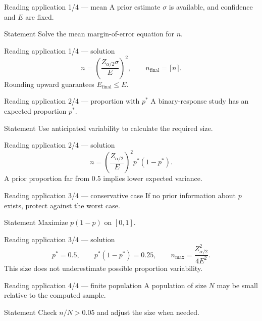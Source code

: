 \documentclass[10pt,aspectratio=169]{beamer}
\begin{document}
\begin{frame}{Reading application 1/4 --- mean}
  \footnotesize
  A prior estimate $\sigma$ is available, and confidence and $E$ are fixed.
  \begin{block}{Statement}
    Solve the mean margin-of-error equation for $n$.
  \end{block}
\end{frame}

\begin{frame}{Reading application 1/4 --- solution}
  \footnotesize
  \[
    n=\left(\frac{Z_{\alpha/2}\sigma}{E}\right)^2,
    \qquad n_{\text{final}}=\lceil n\rceil.
  \]
  Rounding upward guarantees $E_{\text{final}}\le E$.
\end{frame}

\begin{frame}{Reading application 2/4 --- proportion with $p^*$}
  \footnotesize
  A binary-response study has an expected proportion $p^*$.
  \begin{block}{Statement}
    Use anticipated variability to calculate the required size.
  \end{block}
\end{frame}

\begin{frame}{Reading application 2/4 --- solution}
  \footnotesize
  \[
    n=\left(\frac{Z_{\alpha/2}}{E}\right)^2p^*(1-p^*).
  \]
  A prior proportion far from $0.5$ implies lower expected variance.
\end{frame}

\begin{frame}{Reading application 3/4 --- conservative case}
  \footnotesize
  If no prior information about $p$ exists, protect against the worst case.
  \begin{block}{Statement}
    Maximize $p(1-p)$ on $[0,1]$.
  \end{block}
\end{frame}

\begin{frame}{Reading application 3/4 --- solution}
  \footnotesize
  \[
    p^*=0.5,\qquad p^*(1-p^*)=0.25,
    \qquad n_{\max}=\frac{Z_{\alpha/2}^2}{4E^2}.
  \]
  This size does not underestimate possible proportion variability.
\end{frame}

\begin{frame}{Reading application 4/4 --- finite population}
  \footnotesize
  A population of size $N$ may be small relative to the computed sample.
  \begin{block}{Statement}
    Check $n/N>0.05$ and adjust the size when needed.
  \end{block}
\end{frame}
\end{document}
